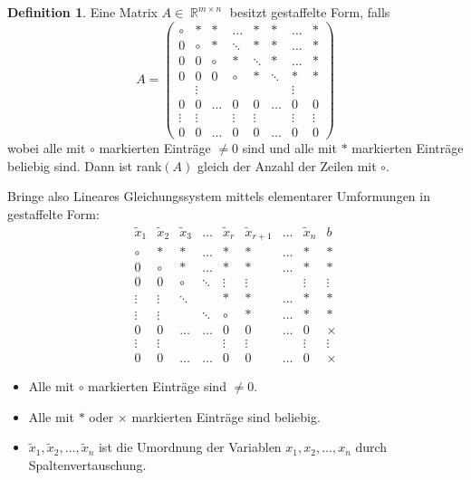 \documentclass[a4paper,12pt]{article}
\DeclareMathOperator{\R}{\mathbb R}
\theoremstyle{definition}
\newtheorem{definition}[axiom]{Definition}
\begin{document}
	\begin{definition}
		Eine Matrix $A \in \R^{m \times n}$ besitzt gestaffelte Form, falls
		\[
			A = \left( 
				\begin{array}{cccccccc}
					\circ & \ast & \ast &\ldots & \ast & \ast &\ldots & \ast\\
					0 & \circ & \ast & \ddots & \ast & \ast & \ldots & \ast\\
					0 & 0 & \circ & \ast & \ddots & \ast & \ldots & \ast\\
					0 & 0 & 0 & \circ & \ast & \ddots & \ast & \ast\\
					& \vdots &&&&& \vdots &\\
					0 & 0 & \ldots & 0 & 0 & \ldots & 0 & 0\\
					\vdots & \vdots && \vdots &\vdots && \vdots & \vdots\\
					0 & 0 & \ldots & 0 & 0 &\ldots & 0 & 0
				\end{array}
			\right)
		\]
		wobei alle mit $\circ$ markierten Einträge $\neq 0$ sind und alle mit $\ast$ markierten Einträge beliebig sind. Dann ist rank$(A)$ gleich der Anzahl der Zeilen mit $\circ$.
	\end{definition}
	Bringe also Lineares Gleichungssystem mittels elementarer Umformungen in gestaffelte Form:
	\[
		\begin{array}{cccccccc|c}
			\tilde{x}_1 & \tilde{x}_2 & \tilde{x}_3 & \ldots & \tilde{x}_r & \tilde{x}_{r + 1} & \ldots & \tilde{x}_n & b\\\hline
			\circ & \ast & \ast & \ldots & \ast & \ast & \ldots & \ast & \ast\\
			0 & \circ & \ast & \ldots & \ast & \ast & \ldots & \ast & \ast\\
			0 & 0 & \circ & \ddots & \vdots & \vdots & & \vdots & \vdots\\
			\vdots & \vdots & \ddots & & \ast & \ast & \ldots & \ast & \ast\\
			\vdots & \vdots & & \ddots & \circ & \ast &\ldots & \ast &\ast\\
			0 & 0 & \ldots & \ldots & 0 & 0 & \ldots & 0 &\times\\
			\vdots & \vdots &&& \vdots & \vdots && \vdots & \vdots\\
			0 & 0 & \ldots & \ldots & 0 & 0 & \ldots & 0 & \times
		\end{array}
	\]
	\begin{itemize}
		\item Alle mit $\circ$ markierten Einträge sind $\neq 0$.
		\item Alle mit $\ast$ oder $\times$ markierten Einträge sind beliebig.
		\item $\tilde{x}_1, \tilde{x}_2, \ldots, \tilde{x}_n$ ist die Umordnung der Variablen $x_1, x_2, \ldots, x_n$ durch Spaltenvertauschung. 
	\end{itemize}
\end{document}
